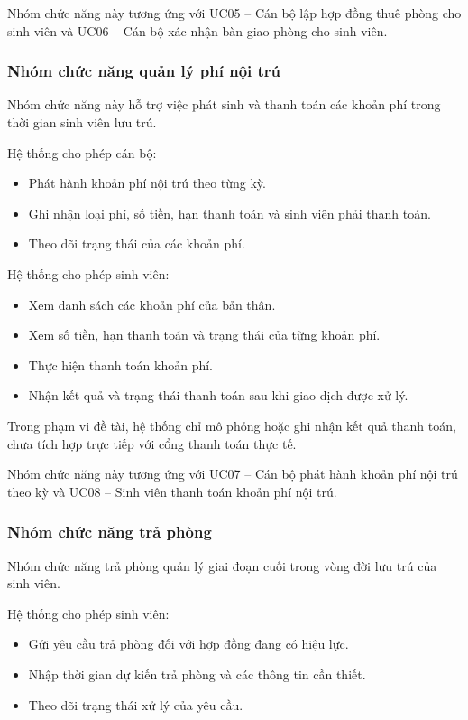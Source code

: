 Nhóm chức năng này tương ứng với UC05 – Cán bộ lập hợp đồng thuê phòng cho sinh viên và UC06 – Cán bộ xác nhận bàn giao phòng cho sinh viên.

\subsubsection{Nhóm chức năng quản lý phí nội trú}

Nhóm chức năng này hỗ trợ việc phát sinh và thanh toán các khoản phí trong thời gian sinh viên lưu trú.

Hệ thống cho phép cán bộ:

\begin{itemize}[leftmargin=1.4em]
\item Phát hành khoản phí nội trú theo từng kỳ.
\item Ghi nhận loại phí, số tiền, hạn thanh toán và sinh viên phải thanh toán.
\item Theo dõi trạng thái của các khoản phí.
\end{itemize}

Hệ thống cho phép sinh viên:

\begin{itemize}[leftmargin=1.4em]
\item Xem danh sách các khoản phí của bản thân.
\item Xem số tiền, hạn thanh toán và trạng thái của từng khoản phí.
\item Thực hiện thanh toán khoản phí.
\item Nhận kết quả và trạng thái thanh toán sau khi giao dịch được xử lý.
\end{itemize}

Trong phạm vi đề tài, hệ thống chỉ mô phỏng hoặc ghi nhận kết quả thanh toán, chưa tích hợp trực tiếp với cổng thanh toán thực tế.

Nhóm chức năng này tương ứng với UC07 – Cán bộ phát hành khoản phí nội trú theo kỳ và UC08 – Sinh viên thanh toán khoản phí nội trú.

\subsubsection{Nhóm chức năng trả phòng}

Nhóm chức năng trả phòng quản lý giai đoạn cuối trong vòng đời lưu trú của sinh viên.

Hệ thống cho phép sinh viên:

\begin{itemize}[leftmargin=1.4em]
\item Gửi yêu cầu trả phòng đối với hợp đồng đang có hiệu lực.
\item Nhập thời gian dự kiến trả phòng và các thông tin cần thiết.
\item Theo dõi trạng thái xử lý của yêu cầu.
\end{itemize}

